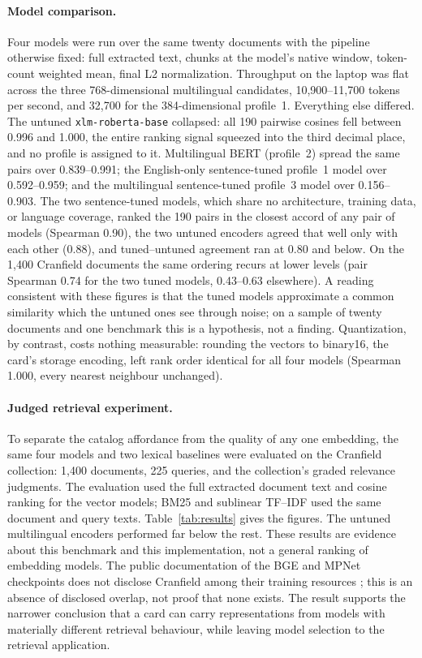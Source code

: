 \documentclass[11pt]{article}
\begin{document}
\paragraph{Model comparison.} Four models were run over the same twenty
documents with the pipeline otherwise fixed: full extracted text, chunks at
the model's native window, token-count weighted mean, final L2
normalization. Throughput on the laptop was flat across the three
768-dimensional multilingual candidates, 10,900--11,700 tokens per second,
and 32,700 for the 384-dimensional profile~1. Everything else differed. The
untuned \nolinkurl{xlm-roberta-base} collapsed: all 190 pairwise cosines fell
between 0.996 and 1.000, the entire ranking signal squeezed into the third
decimal place, and no profile is assigned to it. Multilingual BERT
(profile~2) spread the same pairs over 0.839--0.991; the English-only
sentence-tuned profile~1 model over 0.592--0.959; and the multilingual
sentence-tuned profile~3 model over 0.156--0.903. The two sentence-tuned
models, which share no architecture, training data, or language coverage,
ranked the 190 pairs in the closest accord of any pair of models (Spearman
0.90), the two untuned encoders agreed that well only with each other (0.88),
and tuned--untuned agreement ran at 0.80 and below. On the 1,400 Cranfield
documents the same ordering recurs at lower levels (pair Spearman 0.74 for
the two tuned models, 0.43--0.63 elsewhere). A reading consistent with these
figures is that the tuned models approximate a common similarity which the
untuned ones see through noise; on a sample of twenty documents and one
benchmark this is a hypothesis, not a finding. Quantization, by contrast,
costs nothing measurable: rounding the vectors to binary16, the card's
storage encoding, left rank order identical for all four models (Spearman
1.000, every nearest neighbour unchanged).

\paragraph{Judged retrieval experiment.} To separate the catalog affordance
from the quality of any one embedding, the same four models and two lexical
baselines were evaluated on the Cranfield collection: 1,400 documents, 225
queries, and the collection's graded relevance judgments. The evaluation used
the full extracted document text and cosine ranking for the vector models;
BM25 and sublinear TF--IDF used the same document and query texts.
Table~\ref{tab:results} gives the figures. The untuned multilingual encoders
performed far below the rest. These results are evidence about this
benchmark and this implementation, not a general ranking of embedding
models. The public documentation of the BGE and MPNet checkpoints does not
disclose Cranfield among their training resources \citep{BAAI:2023,Reimers:2021};
this is an absence of disclosed overlap, not proof that none exists. The
result supports the narrower conclusion that a card can carry
representations from models with materially different retrieval behaviour,
while leaving model selection to the retrieval application.
\end{document}
